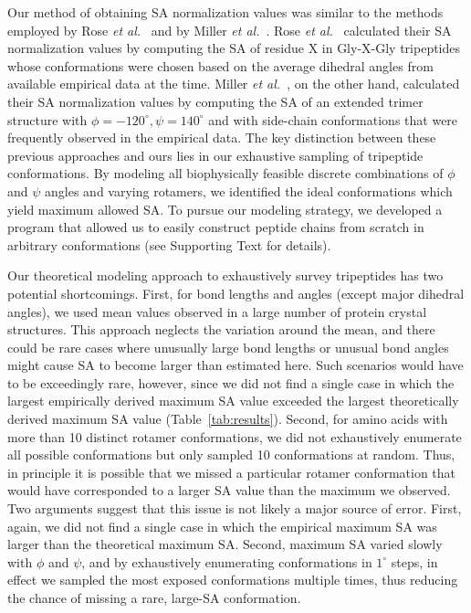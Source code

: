 \documentclass[11pt]{article}
\begin{document}
Our method of obtaining SA normalization values was similar to the methods employed by Rose \emph{et al.}~\cite{Rose1985} and by Miller \emph{et al.}~\cite{Miller1987}. Rose \emph{et al.}~\cite{Rose1985} calculated their SA normalization values by computing the SA of residue X in Gly-X-Gly tripeptides whose conformations were chosen based on the average dihedral angles from available empirical data at the time. Miller \emph{et al.}~\cite{Miller1987}, on the other hand, calculated their SA normalization values by computing the SA of an extended trimer structure with $\phi = -120^\circ, \psi= 140^\circ$ and with side-chain conformations that were frequently observed in the empirical data. The key distinction between these previous approaches and ours lies in our exhaustive sampling of tripeptide conformations. By modeling all biophysically feasible discrete combinations of $\phi$ and $\psi$ angles and varying rotamers, we identified the ideal conformations which yield maximum allowed SA. To pursue our modeling strategy, we developed a program that allowed us to easily construct peptide chains from scratch in arbitrary conformations (see Supporting Text for details).

Our theoretical modeling approach to exhaustively survey tripeptides has two potential shortcomings. First, for bond lengths and angles (except major dihedral angles), we used mean values observed in a large number of protein crystal structures. This approach neglects the variation around the mean, and there could be rare cases where unusually large bond lengths or unusual bond angles might cause SA to become larger than estimated here. Such scenarios would have to be exceedingly rare, however, since we did not find a single case in which the largest empirically derived maximum SA value exceeded the largest theoretically derived maximum SA value (Table~\ref{tab:results}). Second, for amino acids with more than 10 distinct rotamer conformations, we did not exhaustively enumerate all possible conformations but only sampled 10 conformations at random. Thus, in principle it is possible that we missed a particular rotamer conformation that would have corresponded to a larger SA value than the maximum we observed. Two arguments suggest that this issue is not likely a major source of error. First, again, we did not find a single case in which the empirical maximum SA was larger than the theoretical maximum SA. Second, maximum SA varied slowly with $\phi$ and $\psi$, and by exhaustively enumerating conformations in $1^\circ$ steps, in effect we sampled the most exposed conformations multiple times, thus reducing the chance of missing a rare, large-SA conformation.
\end{document}
